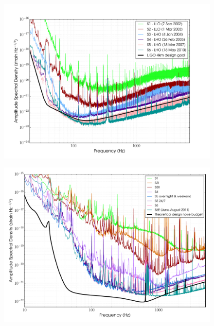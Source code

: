 \documentclass{article}
\begin{document}
\begin{figure}[]
\begin{center}
\includegraphics[width=1\columnwidth]{./figures/LIGOSrunASDs/LIGOSrunASDs}
\caption{ \protect}
\end{center}
\end{figure}


\begin{figure}[]
\begin{center}
\includegraphics[width=1\columnwidth]{./figures/GEOSrunASDs/GEOSrunASDs}
\caption{ \protect}
\end{center}
\end{figure}
\end{document}
